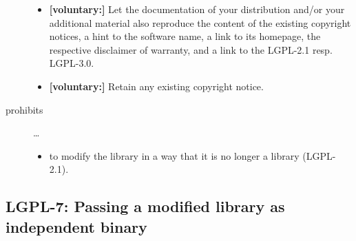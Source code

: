 \begin{description}
\begin{itemize}
  \item \textbf{[voluntary:]} Let the documentation of your distribution and/or
  your additional material also reproduce the content of the existing
  copyright notices, a hint to the software name, a link to its homepage,
  the respective disclaimer of warranty, and a link to the LGPL-2.1 resp.
  LGPL-3.0.
  
  \item \textbf{[voluntary:]} Retain any existing copyright notice. 

\end{itemize}

\item[prohibits] \ldots
\begin{itemize}
  \item to modify the library in a way that it is no longer a library
  (LGPL-2.1).
\end{itemize}

\end{description}


\subsection{LGPL-7: Passing a modified library as independent binary}

